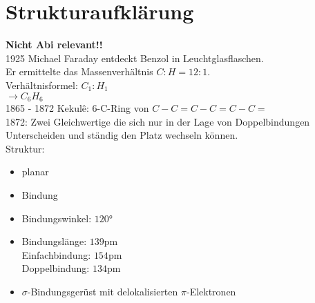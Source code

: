 \section{Strukturaufklärung}
\textbf{Nicht Abi relevant!!} \\
1925 Michael Faraday entdeckt Benzol in Leuchtglasflaschen. \\
Er ermittelte das Massenverhältnis $C:H = 12:1$. \\
Verhältnisformel: $C_1:H_1$ \\
$\rightarrow C_6H_6$ \\

1865 - 1872 Kekulê: 6-C-Ring von $C-C=C-C=C-C=$\\
1872: Zwei Gleichwertige die sich nur in der Lage von Doppelbindungen Unterscheiden und ständig den Platz wechseln können. \\
Struktur:
\begin{itemize}
    \item planar
    \item Bindung
    \item Bindungswinkel: $120$°
    \item Bindungslänge: $139$pm \\
        Einfachbindung: $154$pm \\
        Doppelbindung: $134$pm
    \item $\sigma$-Bindungsgerüst mit delokalisierten $\pi$-Elektronen
\end{itemize}

